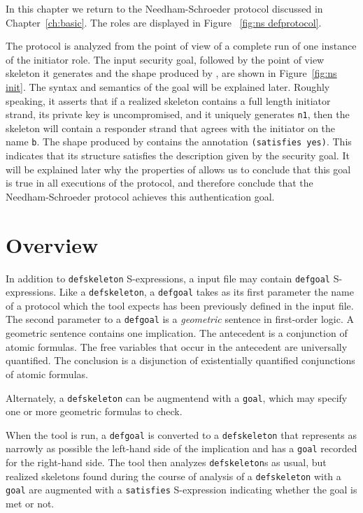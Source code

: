 In this chapter we return to the Needham-Schroeder protocol discussed
in Chapter~\ref{ch:basic}.  The roles are displayed in
Figure~%
\ref{fig:ns defprotocol}.

The protocol is analyzed from the point of view of a complete run of
one instance of the initiator role.  The input security goal, followed
by the point of view skeleton it generates and the shape produced by
{\cpsa}, are shown in Figure~\ref{fig:ns init}.  The syntax and
semantics of the goal will be explained later.  Roughly speaking, it
asserts that if a realized skeleton contains a full length initiator
strand, its private key is uncompromised, and it uniquely generates
\texttt{n1}, then the skeleton will contain a responder strand that
agrees with the initiator on the name \texttt{b}.  The shape produced
by {\cpsa} contains the annotation \texttt{(satisfies yes)}.  This
indicates that its structure satisfies the description given by the
security goal.  It will be explained later why the properties of
{\cpsa} allows us to conclude that this goal is true in all executions
of the protocol, and therefore conclude that the Needham-Schroeder
protocol achieves this authentication goal.

\section{Overview}\label{sec:goalsoverview}

In addition to \texttt{defskeleton} S-expressions, a {\cpsa} input
file may contain \texttt{defgoal} S-expressions.  Like a
\texttt{defskeleton}, a \texttt{defgoal} takes as its first parameter
the name of a protocol which the tool expects has been previously
defined in the input file.  The second parameter to a \texttt{defgoal}
is a \emph{geometric} sentence in first-order logic.  A geometric
sentence contains one implication.  The antecedent is a conjunction
of atomic formulas.  The free variables that occur in the antecedent
are universally quantified.  The conclusion is a disjunction of
existentially quantified conjunctions of atomic formulas.

Alternately, a \texttt{defskeleton} can be augmentend with a
\texttt{goal}, which may specify one or more geometric
formulas to check.

When the tool is run, a \texttt{defgoal} is converted to a
\texttt{defskeleton} that represents as narrowly as possible the
left-hand side of the implication and has a \texttt{goal} recorded for
the right-hand side.  The tool then analyzes \texttt{defskeleton}s as
usual, but realized skeletons found during the course of analysis of a
\texttt{defskeleton} with a \texttt{goal} are augmented with
a \texttt{satisfies} S-expression indicating whether the goal is met or
not.

